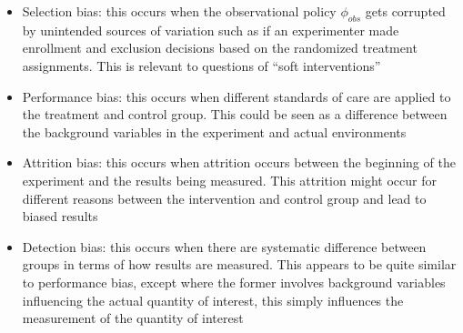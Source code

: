 \begin{itemize}
    \item Selection bias: this occurs when the observational policy $\phi_{obs}$ gets corrupted by unintended sources of variation such as if an experimenter made enrollment and exclusion decisions based on the randomized treatment assignments. This is relevant to questions of ``soft interventions''
    \item Performance bias: this occurs when different standards of care are applied to the treatment and control group. This could be seen as a difference between the background variables in the experiment and actual environments
    \item Attrition bias: this occurs when attrition occurs between the beginning of the experiment and the results being measured. This attrition might occur for different reasons between the intervention and control group and lead to biased results
    \item Detection bias: this occurs when there are systematic difference between groups in terms of how results are measured. This appears to be quite similar to performance bias, except where the former involves background variables influencing the actual quantity of interest, this simply influences the measurement of the quantity of interest
\end{itemize}

